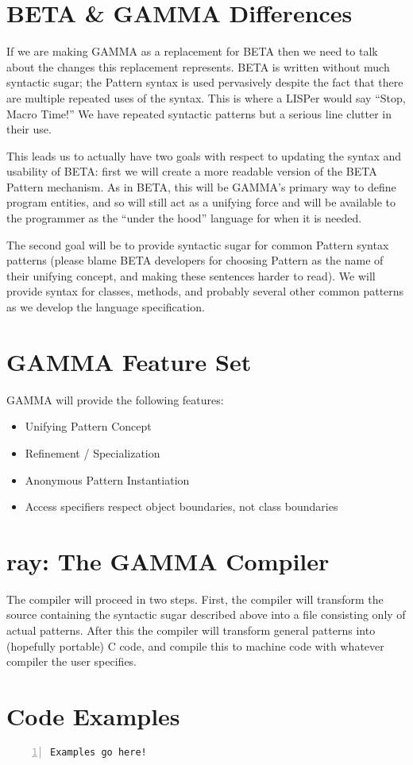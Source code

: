 \documentclass[10pt]{article}
\newcommand{\Lang}{GAMMA}
\newcommand{\Compiler}{ray}
\newcommand{\OLang}{BETA}
\begin{document}
\section*{\OLang{} \& \Lang{} Differences}
If we are making \Lang{} as a replacement for \OLang{} then we need to talk
about the changes this replacement represents. \OLang{} is written without
much syntactic sugar; the Pattern syntax is used pervasively despite the
fact that there are multiple repeated uses of the syntax. This is where a
LISPer would say ``Stop, Macro Time!'' We have repeated syntactic patterns
but a serious line clutter in their use.

This leads us to actually have two goals with respect to updating the syntax
and usability of \OLang{}: first we will create a more readable version of
the \OLang{} Pattern mechanism. As in \OLang, this will be \Lang{}'s primary
way to define program entities, and so will still act as a unifying force
and will be available to the programmer as the ``under the hood'' language
for when it is needed.

The second goal will be to provide syntactic sugar for common Pattern syntax
patterns (please blame \OLang{} developers for choosing Pattern as the name
of their unifying concept, and making these sentences harder to read). We will
provide syntax for classes, methods, and probably several other common patterns
as we develop the language specification.

\section*{\Lang{} Feature Set}

\Lang{} will provide the following features:

\begin{itemize}
\item Unifying Pattern Concept
\item Refinement / Specialization
\item Anonymous Pattern Instantiation
\item Access specifiers respect object boundaries, not class boundaries
\end{itemize}

\section*{\Compiler{}: The \Lang{} Compiler}

The compiler will proceed in two steps. First, the compiler will transform
the source containing the syntactic sugar described above into a file
consisting only of actual patterns. After this the compiler will transform
general patterns into (hopefully portable) C code, and compile this to
machine code with whatever compiler the user specifies.

\section*{Code Examples}

\begin{lstlisting}[numbers=left,label=The All-mighty Pattern,caption=The All-mighty Pattern]
Examples go here!
\end{lstlisting}
\end{document}
